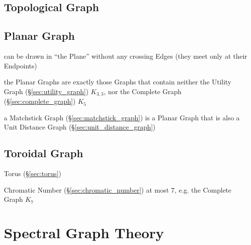 \subsection{Topological Graph}\label{sec:topological_graph}




\subsection{Planar Graph}\label{sec:planar_graph}

can be drawn in ``the Plane'' without any crossing Edges (they meet only at
their Endpoints)


the Planar Graphs are exactly those Graphs that contain neither the Utility
Graph (\S\ref{sec:utility_graph}) $K_{3,3}$, nor the Complete Graph
(\S\ref{sec:complete_graph}) $K_5$

a Matchstick Graph (\S\ref{sec:matchstick_graph}) is a Planar Graph that
is also a Unit Distance Graph (\S\ref{sec:unit_distance_graph})



\subsection{Toroidal Graph}\label{sec:toroidal_graph}

Torus (\S\ref{sec:torus})

Chromatic Number (\S\ref{sec:chromatic_number}) at most $7$, e.g. the Complete
Graph $K_7$



\section{Spectral Graph Theory}\label{sec:spectral_graph_theory}

